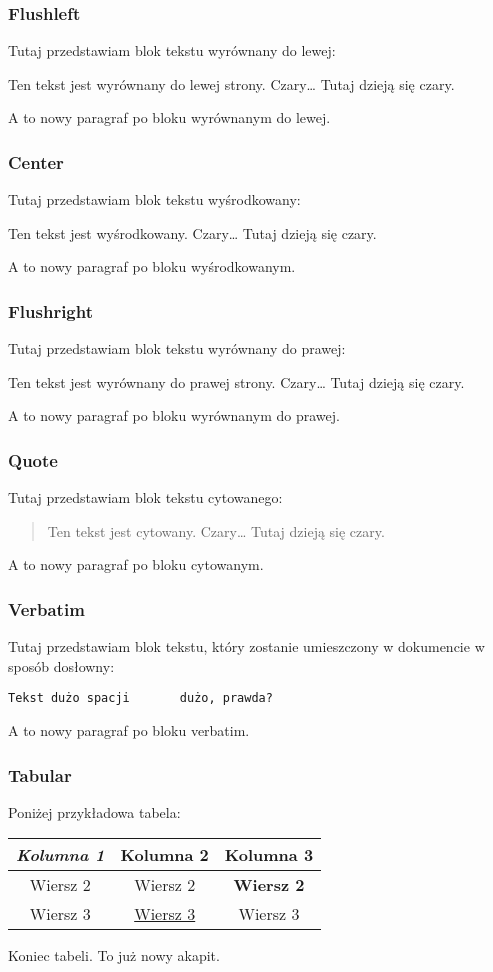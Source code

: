 \documentclass[10pt,a4paper]{article}
\begin{document}
\subsubsection{Flushleft}
Tutaj przedstawiam blok tekstu wyrównany do lewej:
\begin{flushleft}
Ten tekst jest wyrównany do lewej strony. Czary\ldots{} Tutaj dzieją się czary.
\end{flushleft}
A to nowy paragraf po bloku wyrównanym do lewej.

\subsubsection{Center}
Tutaj przedstawiam blok tekstu wyśrodkowany:
\begin{center}
Ten tekst jest wyśrodkowany. Czary\ldots{} Tutaj dzieją się czary.
\end{center}
A to nowy paragraf po bloku wyśrodkowanym.

\subsubsection{Flushright}
Tutaj przedstawiam blok tekstu wyrównany do prawej:
\begin{flushright}
Ten tekst jest wyrównany do prawej strony. Czary\ldots{} Tutaj dzieją się czary.
\end{flushright}
A to nowy paragraf po bloku wyrównanym do prawej.

\subsubsection{Quote}
Tutaj przedstawiam blok tekstu cytowanego:
\begin{quote}
Ten tekst jest cytowany. Czary\ldots{} Tutaj dzieją się czary.
\end{quote}
A to nowy paragraf po bloku cytowanym.

\subsubsection{Verbatim}
Tutaj przedstawiam blok tekstu, który zostanie umieszczony w dokumencie w sposób dosłowny:
\begin{verbatim}
Tekst dużo spacji       dużo, prawda?
\end{verbatim}
A to nowy paragraf po bloku verbatim.

\subsubsection{Tabular}
Poniżej przykładowa tabela: \newline
\begin{tabular}{|c|c|c|}
	\hline
	\emph{Kolumna 1} & Kolumna 2 & Kolumna 3 \\ \hline
	Wiersz 2 & Wiersz 2 & \textbf{Wiersz 2} \\ \hline
	Wiersz 3 & \underline{Wiersz 3} & Wiersz 3 \\
	\hline
\end{tabular}
\newline
Koniec tabeli. To już nowy akapit.
\end{document}
